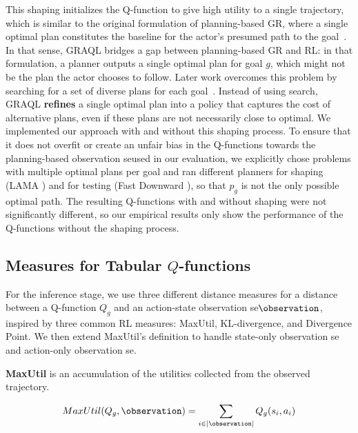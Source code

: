 \documentclass[letterpaper]{article}
\begin{document}
This shaping initializes the Q-function to give high utility to a single trajectory, which is similar to the original formulation of planning-based GR, where a single optimal plan constitutes the baseline for the actor's presumed path to the goal~\cite{ramirez2009plan}.
In that sense, GRAQL bridges a gap between planning-based GR and RL: in that formulation, a planner outputs a single optimal plan for goal $g$, which might not be the plan the actor chooses to follow.
%
%
Later work overcomes this problem by searching for a set of diverse plans for each goal~\cite{sohrabi2016plan}.
%
Instead of using search, GRAQL \textbf{refines} a single optimal plan into a  policy that captures the cost of alternative plans, even if these plans are not necessarily close to optimal.
%
We implemented our approach with and without this shaping process.
To ensure that it does not overfit or create an unfair bias in the Q-functions towards the planning-based observation seused in our evaluation, we explicitly chose problems with multiple optimal plans per goal and ran different planners for shaping (LAMA \cite{richter2010lama}) and for testing (Fast Downward \cite{helmert2006fast}), so that $p_g$ is not the only possible optimal path.
The resulting Q-functions with and without shaping were not significantly different, so our empirical results only show the performance of the Q-functions without the shaping process.


\subsection{Measures for Tabular $Q$-functions}
For the inference stage, we use three different distance measures for a distance between a Q-function $Q_g$ and an action-state observation se$\observation$, inspired by three common RL measures: MaxUtil, KL-divergence, and Divergence Point.
We then extend MaxUtil's definition to handle state-only observation se and action-only observation se.

\noindent \textbf{MaxUtil} is an accumulation of the utilities collected from the observed trajectory.

\begin{equation}
    MaxUtil(Q_g, \observation) = \displaystyle\sum\limits_{i \in |\observation|} Q_g(s_i,a_i)
\end{equation}
\end{document}
